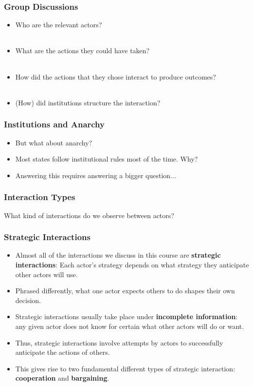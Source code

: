 \documentclass{beamer}
\begin{document}
\begin{frame} 
	\frametitle{\LARGE{Group Discussions}}
	\begin{itemize}
		\item Who are the relevant actors?
		\\~\\
		\item What are the actions they could have taken? 
		\\~\\ 
		\item How did the actions that they chose interact to produce outcomes? 
		\\~\\ 
		\item (How) did institutions structure the interaction? 
	\end{itemize}
\end{frame}
	
\begin{frame} 
	\frametitle{\LARGE{Institutions and Anarchy}}	
	\begin{itemize}
		\item But what about anarchy? \pause
		\item Most states follow institutional rules most of the time. Why? \pause
		\item Answering this requires answering a bigger question...
	\end{itemize}
\end{frame}

\begin{frame} 
	\frametitle{\LARGE{Interaction Types}}
	\centering
\LARGE{What kind of interactions do we observe between actors?}
\end{frame}

\begin{frame} 
	\frametitle{\LARGE{Strategic Interactions}}
	\begin{itemize}
		\item Almost all of the interactions we discuss in this course are \textbf{strategic interactions}: Each actor’s strategy depends on what strategy they anticipate other actors will use. \pause
		\item Phrased differently, what one actor expects others to do shapes their own decision. \pause
		\item Strategic interactions usually take place under \textbf{incomplete information}: any given actor does not know for certain what other actors will do or want. \pause
		\item Thus, strategic interactions involve attempts by actors to successfully anticipate the actions of others.  \pause
		\item This gives rise to two fundamental different types of strategic interaction: \textbf{cooperation} and \textbf{bargaining}.
	\end{itemize}
\end{frame}
\end{document}
